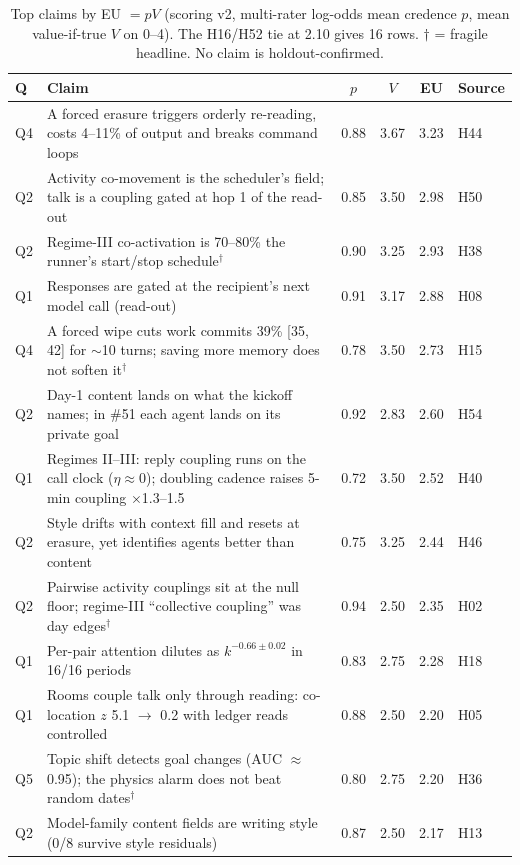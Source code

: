 \documentclass[aps,pre,reprint,10pt,nofootinbib]{revtex4-2}
\begin{document}
\begin{table}[t]
\caption{\label{tab:eu}Top claims by EU $=pV$ (scoring v2, multi-rater log-odds mean credence $p$, mean value-if-true $V$ on 0--4). The H16/H52 tie at 2.10 gives 16 rows. $\dagger$ = fragile headline. No claim is holdout-confirmed.}
\begin{ruledtabular}
\begin{tabular}{lp{11.8cm}cccl}
Q & Claim & $p$ & $V$ & EU & Source \\
\hline
Q4 & A forced erasure triggers orderly re-reading, costs 4--11\% of output and breaks command loops & 0.88 & 3.67 & 3.23 & H44 \\
Q2 & Activity co-movement is the scheduler's field; talk is a coupling gated at hop 1 of the read-out & 0.85 & 3.50 & 2.98 & H50 \\
Q2 & Regime-III co-activation is 70--80\% the runner's start/stop schedule$^\dagger$ & 0.90 & 3.25 & 2.93 & H38 \\
Q1 & Responses are gated at the recipient's next model call (read-out) & 0.91 & 3.17 & 2.88 & H08 \\
Q4 & A forced wipe cuts work commits 39\% [35, 42] for $\sim$10 turns; saving more memory does not soften it$^\dagger$ & 0.78 & 3.50 & 2.73 & H15 \\
Q2 & Day-1 content lands on what the kickoff names; in \#51 each agent lands on its private goal & 0.92 & 2.83 & 2.60 & H54 \\
Q1 & Regimes II--III: reply coupling runs on the call clock ($\eta\approx0$); doubling cadence raises 5-min coupling $\times$1.3--1.5 & 0.72 & 3.50 & 2.52 & H40 \\
Q2 & Style drifts with context fill and resets at erasure, yet identifies agents better than content & 0.75 & 3.25 & 2.44 & H46 \\
Q2 & Pairwise activity couplings sit at the null floor; regime-III ``collective coupling'' was day edges$^\dagger$ & 0.94 & 2.50 & 2.35 & H02 \\
Q1 & Per-pair attention dilutes as $k^{-0.66\pm0.02}$ in 16/16 periods & 0.83 & 2.75 & 2.28 & H18 \\
Q1 & Rooms couple talk only through reading: co-location $z$ 5.1 $\to$ 0.2 with ledger reads controlled & 0.88 & 2.50 & 2.20 & H05 \\
Q5 & Topic shift detects goal changes (AUC $\approx$ 0.95); the physics alarm does not beat random dates$^\dagger$ & 0.80 & 2.75 & 2.20 & H36 \\
Q2 & Model-family content fields are writing style (0/8 survive style residuals) & 0.87 & 2.50 & 2.17 & H13 \\

\end{tabular}
\end{ruledtabular}
\end{table}
\end{document}
